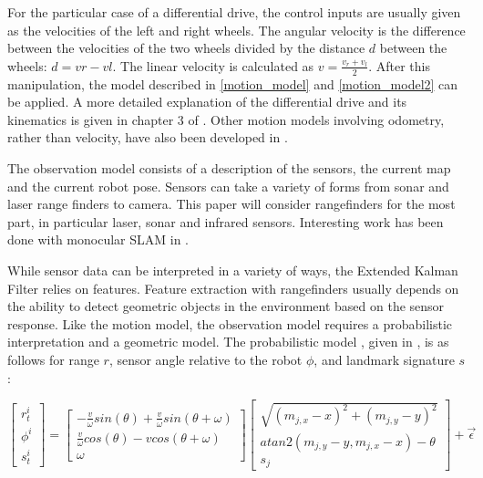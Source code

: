 \documentclass[12pt]{article}
\begin{document}
For the particular case of a differential drive, the control inputs are usually given as the velocities of the left and right wheels.  The angular velocity is the difference between the velocities of the two wheels divided by the distance $d$ between the wheels:  $d=vr-vl$.  The linear velocity is calculated as $v=\frac{v_r+v_l}{2}$.  After this manipulation, the model described in \ref{motion_model} and \ref{motion_model2} can be applied.  A more detailed explanation of the differential drive and its kinematics is given in chapter 3 of \cite{Dudek}.  Other motion models involving odometry, rather than velocity, have also been developed in \cite{ThrunPR2005}.

The observation model consists of a description of the sensors, the current map and the current robot pose.  Sensors can take a variety of forms from sonar and laser range finders to camera.  This paper will consider rangefinders for the most part, in particular laser, sonar and infrared sensors.  Interesting work has been done with monocular SLAM in \cite{MonoSLAM}.  

While sensor data can be interpreted in a variety of ways, the Extended Kalman Filter relies on features.  Feature extraction with rangefinders usually depends on the ability to detect geometric objects in the environment based on the sensor response.  Like the motion model, the observation model requires a probabilistic interpretation and a geometric model.  The probabilistic model , given in \cite{ThrunPR2005}, is as follows for range $r$, sensor angle relative to the robot $\phi$, and landmark signature $s$:

\begin{equation}\label{motion_model}
\left[ {\begin{array}{cc}
 r_{t}^{i} \\
 \phi^{i} \\
 s_{t}^{i}
\end{array} } \right] =
\left[ {\begin{array}{cc}
 -\frac{v}{\omega} sin(\theta)+\frac{v}{\omega} sin(\theta + \omega) \\
 \frac{v}{\omega} cos(\theta)-v cos(\theta + \omega)  \\
\omega
\end{array} } \right] 
\left[ {\begin{array}{cc}
\sqrt{(m_{j,x}-x)^2+(m_{j,y}-y)^2} \\
atan2(m_{j,y}-y,m_{j,x}-x)-\theta \\
s_j
\end{array} } \right] 
+ \vec{\epsilon}
\end{equation}
\end{document}
